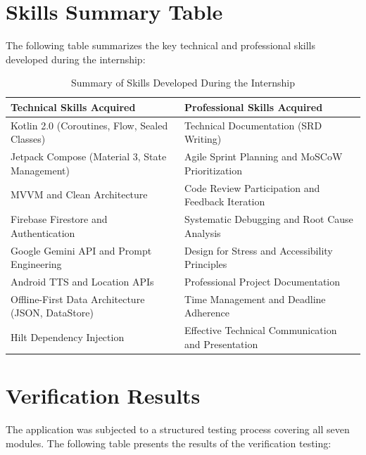 \documentclass[12pt,a4paper]{report}
\begin{document}
\section{Skills Summary Table}

The following table summarizes the key technical and professional skills developed during the internship:

\begin{table}[H]
\centering
\noindent\begin{tabularx}{\textwidth}{|X|X|}
\hline
\rowcolor[gray]{0.9} \textbf{Technical Skills Acquired} & \textbf{Professional Skills Acquired} \\ \hline
Kotlin 2.0 (Coroutines, Flow, Sealed Classes) & Technical Documentation (SRD Writing) \\ \hline
Jetpack Compose (Material 3, State Management) & Agile Sprint Planning and MoSCoW Prioritization \\ \hline
MVVM and Clean Architecture & Code Review Participation and Feedback Iteration \\ \hline
Firebase Firestore and Authentication & Systematic Debugging and Root Cause Analysis \\ \hline
Google Gemini API and Prompt Engineering & Design for Stress and Accessibility Principles \\ \hline
Android TTS and Location APIs & Professional Project Documentation \\ \hline
Offline-First Data Architecture (JSON, DataStore) & Time Management and Deadline Adherence \\ \hline
Hilt Dependency Injection & Effective Technical Communication and Presentation \\ \hline
\end{tabularx}
\caption{Summary of Skills Developed During the Internship}
\end{table}

\section{Verification Results}

The application was subjected to a structured testing process covering all seven modules. The following table presents the results of the verification testing:
\end{document}
